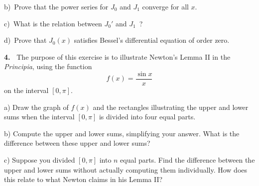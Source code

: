 \documentclass[12pt]{article}
\theoremstyle{definition}
\theoremstyle{remark}
\theoremstyle{definition}
\newenvironment{Solution}{\noindent\textbf{Solution.}}{}
\begin{document}
b)\ Prove that the power series for $J_0$ and $J_1$ converge for all $x$.

c)\ What is the relation between $J_0'$ and $J_1$\ ?

d)\ Prove that $J_0(x)$ satisfies Bessel's differential equation of order zero. 


{\bf 4.\ }  The purpose of this exercise is to illustrate  Newton's Lemma II in the {\it Principia}, using the function 
\[f(x)=\frac{\sin x}{x}\]
on the interval $[0,\pi]$. 

a) Draw the graph of $f(x)$ and the rectangles illustrating the upper and lower sums when the interval $[0,\pi]$ is divided into four equal parts. 

b) Compute the upper and lower sums, simplifying your answer. What is the difference between these upper and lower sums?

c) Suppose you divided $[0,\pi]$ into $n$ equal parts. Find the difference  between the upper and lower sums without actually computing them individually. How does this relate to what Newton claims in his Lemma II?


\end{document}
